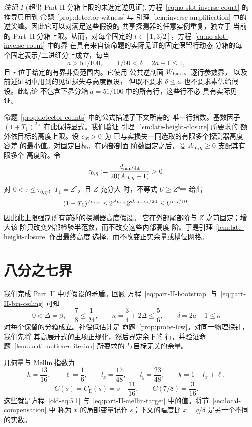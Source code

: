 \documentclass[11pt,a4paper]{article}
\numberwithin{equation}{section}
\numberwithin{figure}{section}
\theoremstyle{definition}
\theoremstyle{remark}
\newtheorem{remark}[theorem]{注记}
\begin{document}
\begin{remark}[超出 Part II 分箱上限的未选定逆见证]
方程~\eqref{eq:no-slot-inverse-count} 的推导只用到
命题~\ref{prop:detector-witness} 与
引理~\ref{lem:inverse-amplification} 中的逆尖峰。因此它可以对满足这些假设的
共享探测器的任意实例重复，独立于
当前的 Part~II 分箱上限。从而，对每个固定的
\(t\in[1,3/2]\)，方程~\eqref{eq:no-slot-inverse-count} 中的界
在具有来自该命题的实际见证的固定保留行动态
分箱的每个固定表示/二进细分上成立，每当
\[
 a>51/100,\qquad 1/50<\delta=2a-1\le1,
\]
且 \(r\) 位于给定的有界非负范围内。它使用
公共逆剖面 \(W_{\rm base}\)、逐行参数界，
以及前述证明中用到的见证损失与高度假设，
但既不要求
\(\delta\le\alpha\) 也不要求素供给假设。此结论
不包含下界分箱 \(a=51/100\) 中的所有行，这些行不必
具有实际见证。
\end{remark}

命题~\ref{prop:detector-counts} 中的公式描述了下文所需的
唯一行指数。基数因子
\((1+T_1)^{A_{\mathcal A}}\) 在此保持显式。我们验证
引理~\ref{lem:late-height-closure} 所要求的
额外依目标的高度上限。设 \(\epsilon_{\rm ht}>0\) 为
已与实损失一同选取的有限多个探测器高度容差
的最小值。对固定目标，在内部剖面
阶数固定之后，设 \(A_{{\rm ht},\eta}\ge0\) 支配其有限多个
高度阶。令
\[
 \tau_{0,\eta}:=
 \frac{d_{\min}\epsilon_{\rm ht}}{20(A_{{\rm ht},\eta}+1)}>0.
\]
对 \(0<\tau\le\tau_{0,\eta}\)，\(T_1=Z^\tau\)，且 \(Z\) 充分大
时，不等式 \(U\ge Z^{d_{\min}}\) 给出
\[
 (1+T_1)^{A_{{\rm ht},\eta}}
 \le 2^{A_{{\rm ht},\eta}}Z^{d_{\min}\epsilon_{\rm ht}/20}
 \le U^{\epsilon_{\rm ht}/10}.
\]
因此此上限强制所有前述的探测器高度假设。
它在外部尾部阶与 \(Z\) 之前固定；增大该
阶只改变外部检验半范数，而不改变这些内部高度
阶。于是引理~\ref{lem:late-height-closure} 作出最终高度
选择，而不改变正实余量或槽位网格。

\section{八分之七界}\label{sec:conclusion}

我们完成 Part~II 中所假设的矛盾。回顾
方程~\eqref{eq:part-II-bootstrap} 与~\eqref{eq:part-II-bin-ceiling}
可知
\[
 0<\Delta=\beta_*-\frac78\le\frac1{24},\qquad
 \kappa=\frac34+2\Delta\le\frac56,\qquad
 \delta=2a-1\le\kappa
\]
对每个保留的分箱成立。补偿低估计是
命题~\ref{prop:probe-low}。对同一物理探针，我们先将
其高展开式的主项正规化，然后界定余下的
行，并验证命题~\ref{lem:continuation-criterion} 所要求的
与目标无关的余量。

几何量与 Mellin 指数为
\[
 h=\frac{13}{16},\qquad \ell=\frac16,\qquad
 l_x=\frac{17}{48},\qquad l_y=\frac{23}{48},\qquad
 h=1-l_x+\ell,
\]
\[
 C(s)=C_{\mathrm{II}}(s)=s-\frac{11}{16},
 \qquad C(7/8)=\frac3{16}.
\]
这些就是方程~\eqref{old-eq:5.1}
与~\eqref{eq:part-II-mellin-target} 中的值。将节~\ref{sec:local-compensation} 中
称为 \(x\) 的局部变量记作 \(s\)；下文的幅度比
\(x=q/\delta\) 是另一个不同的实数。
\end{document}
